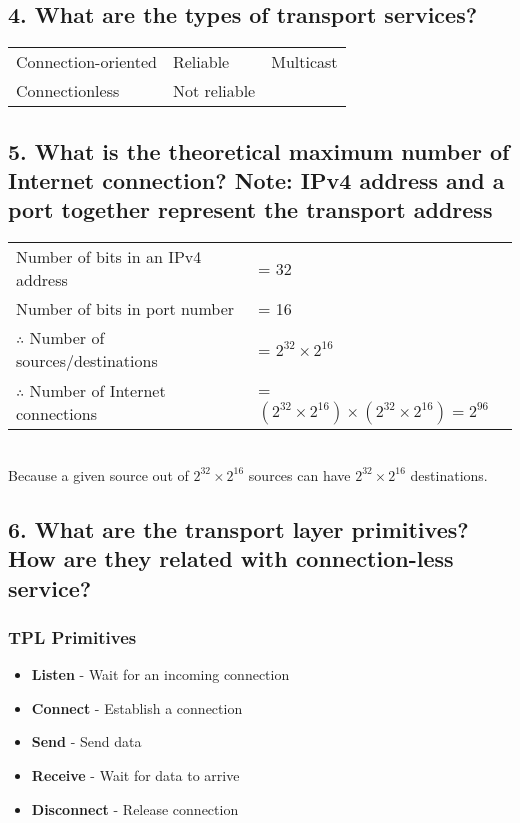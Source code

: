 \documentclass[a4paper,11pt]{article}
\begin{document}
\subsection*{4. What are the types of transport services?}
\begin{tabular}{l |l| l}
Connection-oriented &Reliable & Multicast\\
Connectionless	& Not reliable &
\end{tabular}


\subsection*{5. What is the theoretical maximum number of Internet connection?    Note: IPv4 address and a port together represent the transport address}

\begin{tabular}{l l}
	Number of bits in an IPv4 address &= 32\\
	Number of bits in port number &= 16\\
	$\therefore$ Number of sources/destinations & = $2^{32}\times2^{16}$\\
	$\therefore$ Number of Internet connections & = $(2^{32}\times2^{16}) \times (2^{32}\times2^{16}) = 2^{96}$
\end{tabular}\\[2mm]


Because a given source out of $2^{32}\times2^{16}$ sources can have $2^{32}\times2^{16}$ destinations.


\subsection*{6. What are the transport layer primitives? How are they related with connection-less service?}
\subsubsection*{TPL Primitives}
\begin{itemize}
	\item \textbf{Listen} - Wait for an incoming connection
	\item \textbf{Connect} - Establish a connection
\item 	\textbf{Send} - Send data
\item 	\textbf{Receive} - Wait for data to arrive
\item	\textbf{Disconnect} - Release connection
	
\end{itemize}
\end{document}

